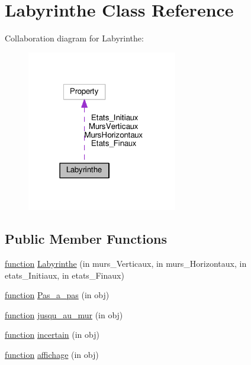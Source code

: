 \hypertarget{class_labyrinthe}{}\section{Labyrinthe Class Reference}
\label{class_labyrinthe}


Collaboration diagram for Labyrinthe\+:\nopagebreak
\begin{figure}[H]
\begin{center}
\leavevmode
\includegraphics[width=186pt]{class_labyrinthe__coll__graph}
\end{center}
\end{figure}
\subsection*{Public Member Functions}
\begin{DoxyCompactItemize}
\item 
\hyperlink{_plan__desuma_functions_8m_ac2ffb26d6f42d3bbcd7847b0873403f4}{function} \hyperlink{class_labyrinthe_a6fffd8c87c9756d8d7b18294daa29ca5}{Labyrinthe} (in murs\+\_\+\+Verticaux, in murs\+\_\+\+Horizontaux, in etats\+\_\+\+Initiaux, in etats\+\_\+\+Finaux)
\item 
\hyperlink{_plan__desuma_functions_8m_ac2ffb26d6f42d3bbcd7847b0873403f4}{function} \hyperlink{class_labyrinthe_a83ffa74a2a322b1866e7366623a7c4e0}{Pas\+\_\+a\+\_\+pas} (in obj)
\item 
\hyperlink{_plan__desuma_functions_8m_ac2ffb26d6f42d3bbcd7847b0873403f4}{function} \hyperlink{class_labyrinthe_a7b95620bd4b1d31b6d76a5d1a0a4c422}{jusqu\+\_\+au\+\_\+mur} (in obj)
\item 
\hyperlink{_plan__desuma_functions_8m_ac2ffb26d6f42d3bbcd7847b0873403f4}{function} \hyperlink{class_labyrinthe_a6ca8be288490170254d0df6579a59ee3}{incertain} (in obj)
\item 
\hyperlink{_plan__desuma_functions_8m_ac2ffb26d6f42d3bbcd7847b0873403f4}{function} \hyperlink{class_labyrinthe_a961e73a265b479f0e68fdf4600ff9cd7}{affichage} (in obj)
\end{DoxyCompactItemize}
